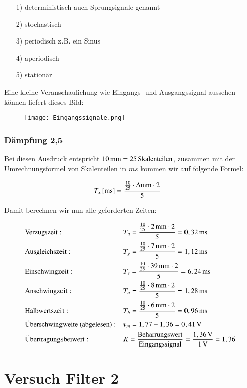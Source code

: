 \begin{itemize}
\item[1)] deterministisch auch Sprungsignale genannt
\item[2)] stochastisch
\item[3)] periodisch z.B. ein Sinus
\item[4)] aperiodisch
\item[5)] stationär
\end{itemize}

Eine kleine Veranschaulichung wie Eingangs- und Ausgangssignal aussehen können liefert dieses Bild:

\begin{figure}[h]
\centering
\texttt{[image: Eingangssignale.png]}
\end{figure}


\subsubsection*{Dämpfung 2,5}

Bei diesen Ausdruck entspricht $\unit[10]{mm} = \unit[25]{Skalenteilen}$, zusammen mit der Umrechnungsformel von Skalenteilen in $ms$ kommen wir auf folgende Formel:

\begin{align*}
\unit[T_x]{[ms]} &= \frac{ \frac{10}{25} \cdot \Delta \text{mm} \cdot 2}{5}
\end{align*}

Damit berechnen wir nun alle geforderten Zeiten:

\begin{align*}
&\text{Verzugszeit}:  &&T_u = \frac{ \frac{10}{25} \cdot \unit[2]{mm} \cdot 2}{5} = \unit[0,32]{ms} \\
&\text{Ausgleichszeit}:  &&T_g = \frac{ \frac{10}{25} \cdot \unit[7]{mm} \cdot 2}{5} = \unit[1,12]{ms} \\
&\text{Einschwingzeit}:  &&T_e = \frac{ \frac{10}{25} \cdot \unit[39]{mm} \cdot 2}{5} = \unit[6,24]{ms} \\
&\text{Anschwingzeit}:  &&T_a = \frac{ \frac{10}{25} \cdot \unit[8]{mm} \cdot 2}{5} = \unit[1,28]{ms} \\
&\text{Halbwertszeit}:  &&T_h = \frac{ \frac{10}{25} \cdot \unit[6]{mm} \cdot 2}{5} = \unit[0,96]{ms} \\
&\text{Überschwingweite (abgelesen)}:  &&v_m = 1,77 - 1,36 = \unit[0,41]{V} \\
&\text{Übertragungsbeiwert}:  &&K = \frac{\text{Beharrungswert}}{\text{Eingangssignal}} = \frac{\unit[1,36]{V}}{\unit[1]{V}} = \unit[1,36]{ } \\
\end{align*}
\section{Versuch Filter 2}





